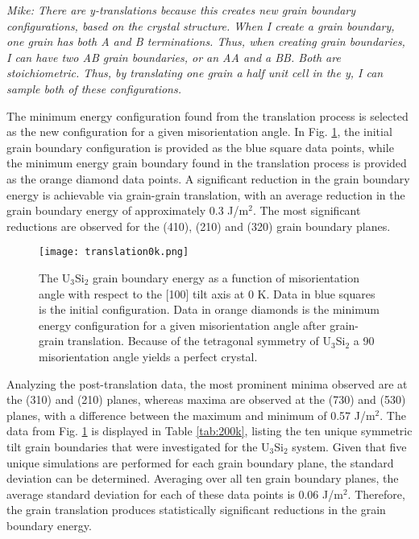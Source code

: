 \documentclass[review]{elsarticle}
\begin{document}
\textit{\color{blue}Mike: There are y-translations because this creates new grain boundary configurations, based on the crystal structure. When I create a grain boundary, one grain has both A and B terminations. Thus, when creating grain boundaries, I can have two AB grain boundaries, or an AA and a BB. Both are stoichiometric. Thus, by translating one grain a half unit cell in the y, I can sample both of these configurations. } 

The minimum energy configuration found from the translation process is selected as the new configuration for a given misorientation angle. In Fig. \ref{fig:translate}, the initial grain boundary configuration is provided as the blue square data points, while the minimum energy grain boundary found in the translation process is provided as the orange diamond data points. A significant reduction in the grain boundary energy is achievable via grain-grain translation, with an average reduction in the grain boundary energy of approximately 0.3 J/m$^{2}$. The most significant reductions are observed for the (410), (210) and (320) grain boundary planes. 

\begin{figure}[h]
 \centering
 \texttt{[image: translation0k.png]} 
 \caption{The U$_{3}$Si$_{2}$ grain boundary energy as a function of misorientation angle with respect to the [100] tilt axis at 0 K. Data in blue squares is the initial configuration. Data in orange diamonds is the minimum energy configuration for a given misorientation angle after grain-grain translation. Because of the tetragonal symmetry of U$_{3}$Si$_{2}$ a 90{\degree} misorientation angle yields a perfect crystal. }
 \label{fig:translate}
\end{figure}

\FloatBarrier

Analyzing the post-translation data, the most prominent minima observed are at the (310) and (210) planes, whereas maxima are observed at the (730) and (530) planes, with a difference between the maximum and minimum of 0.57 J/m$^{2}$.  The data from Fig. \ref{fig:translate} is displayed in Table \ref{tab:200k}, listing the ten unique symmetric tilt grain boundaries that were investigated for the U$_{3}$Si$_{2}$ system. Given that five unique simulations are performed for each grain boundary plane, the standard deviation can be determined. Averaging over all ten grain boundary planes, the average standard deviation for each of these data points is 0.06 J/m$^{2}$. Therefore, the grain translation produces statistically significant reductions in the grain boundary energy. 
\end{document}
